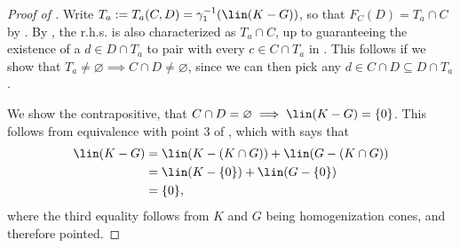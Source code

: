 \documentclass{article}
\theoremstyle{plain}
\theoremstyle{definition}
\theoremstyle{remark}
\begin{document}
\begin{proof}[\hypertarget{loc:generated_faces_are_formed_by_symmetric_differences.proof}{}Proof of ]

Write $T_a := T_a(C,D) = \gamma_1^{-1}(\lin(K-G))$, so that $F_C(D) = T_a \cap C$ by . By , the r.h.s. is also characterized as $T_a \cap C$, up
to guaranteeing the existence of a $d  \in D \cap T_a$ to pair with every $c  \in C \cap T_a$ in .
This follows if we show that $T_a \neq \varnothing \implies C \cap D \neq \varnothing$, since we can then pick any $d \in C \cap D \subseteq D \cap T_a$.

We show the contrapositive, that $C \cap D = \varnothing \implies \lin(K-G)= \{0\}$. This follows from equivalence with point 3 of , which with  says that 
\begin{align*}
\lin(K-G)
&= \lin(K - (K \cap G)) + \lin(G- (K \cap G))\\
&= \lin(K- \{0\}) + \lin(G-\{0\})\\
&= \{0\},
\end{align*}
where the third equality follows from $K$ and $G$ being homogenization cones, and therefore pointed.
\end{proof}
\end{document}
